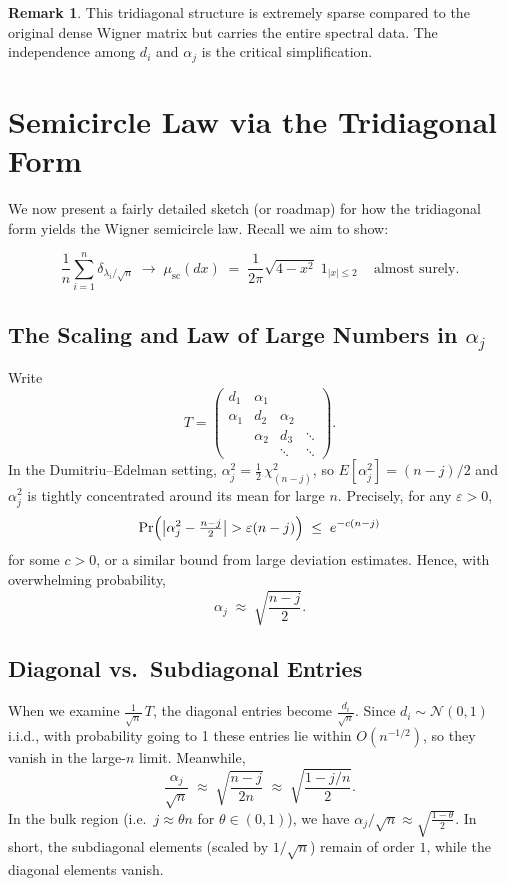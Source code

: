 \documentclass[letterpaper,11pt,oneside,reqno]{article}
\numberwithin{equation}{section}
\theoremstyle{definition}
\newtheorem{remark}[proposition]{Remark}
\begin{document}
\begin{remark}
This tridiagonal structure is extremely sparse compared to the original dense Wigner matrix but carries the entire spectral data. The independence among $d_i$ and $\alpha_j$ is the critical simplification.
\end{remark}

\section{Semicircle Law via the Tridiagonal Form}
\label{sec:semicircle-tridiag}

We now present a fairly detailed sketch (or roadmap) for how the tridiagonal form yields the Wigner semicircle law. Recall we aim to show:

\[
  \frac{1}{n}\sum_{i=1}^n \delta_{\lambda_i/\sqrt{n}}
  \;\longrightarrow\;
  \mu_{\mathrm{sc}}(dx)\;=\;\frac{1}{2\pi}\sqrt{4 - x^2}\; 1_{|x|\le2}\,
  \quad\text{almost surely}.
\]

\subsection{The Scaling and Law of Large Numbers in \(\alpha_j\)}

Write
\[
  T = \begin{pmatrix}
    d_1 & \alpha_1 & & \\
    \alpha_1 & d_2 & \alpha_2 & \\
    & \alpha_2 & d_3 & \ddots \\
    & & \ddots & \ddots
  \end{pmatrix}.
\]
In the Dumitriu--Edelman setting, $\alpha_j^2 = \frac{1}{2}\,\chi^2_{(n-j)}$, so $ E[\alpha_j^2]=(n-j)/2$ and $\alpha_j^2$ is tightly concentrated around its mean for large $n$. Precisely, for any $\varepsilon>0$,
\[
  \Pr\Bigl(\bigl|\alpha_j^2 - \tfrac{n-j}{2}\bigr| > \varepsilon (n-j)\Bigr)
  \;\le\; e^{-c(n-j)}
\]
for some $c>0$, or a similar bound from large deviation estimates. Hence, with overwhelming probability,
\[
  \alpha_j \;\approx\; \sqrt{\frac{n-j}{2}}.
\]

\subsection{Diagonal vs.\ Subdiagonal Entries}

When we examine $\frac{1}{\sqrt{n}}\,T$, the diagonal entries become $\frac{d_i}{\sqrt{n}}$. Since $d_i \sim \mathcal{N}(0,1)$ i.i.d., with probability going to 1 these entries lie within $O(n^{-1/2})$, so they vanish in the large-$n$ limit. Meanwhile,
\[
  \frac{\alpha_j}{\sqrt{n}}
  \;\approx\;
  \sqrt{\frac{n-j}{2n}}
  \;\approx\;
  \sqrt{\frac{1 - j/n}{2}}.
\]
In the bulk region (i.e.\ $j\approx \theta n$ for $\theta\in (0,1)$), we have $\alpha_j/\sqrt{n} \approx \sqrt{\frac{1-\theta}{2}}$. In short, the subdiagonal elements (scaled by $1/\sqrt{n}$) remain of order $1$, while the diagonal elements vanish.
\end{document}
